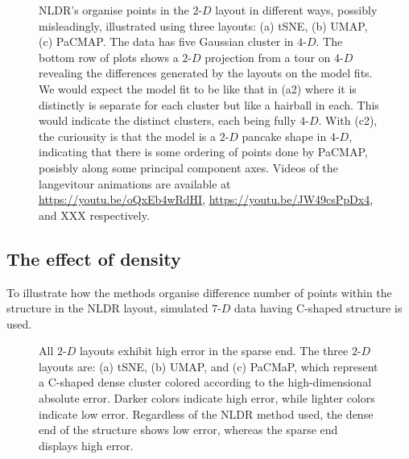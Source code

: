 \documentclass[
  12pt]{article}
\newcommand\gD{$2\text{-}D$}
\begin{document}
\begin{figure}[H]


\caption{\label{fig-five-gau-projs}NLDR's organise points in the \gD{}
layout in different ways, possibly misleadingly, illustrated using three
layouts: (a) tSNE, (b) UMAP, (c) PaCMAP. The data has five Gaussian
cluster in \(4\text{-}D\). The bottom row of plots shows a \gD{}
projection from a tour on \(4\text{-}D\) revealing the differences
generated by the layouts on the model fits. We would expect the model
fit to be like that in (a2) where it is distinctly is separate for each
cluster but like a hairball in each. This would indicate the distinct
clusters, each being fully \(4\text{-}D\). With (c2), the curiousity is
that the model is a \gD{} pancake shape in \(4\text{-}D\), indicating
that there is some ordering of points done by PaCMAP, posisbly along
some principal component axes. Videos of the langevitour animations are
available at \url{https://youtu.be/oQxEb4wRdHI},
\url{https://youtu.be/JW49csPpDx4}, and XXX respectively.}

\end{figure}%

\subsection{The effect of density}\label{the-effect-of-density}

To illustrate how the methods organise difference number of points
within the structure in the NLDR layout, simulated \(7\text{-}D\) data
having C-shaped structure is used.

\begin{figure}[H]


\caption{\label{fig-one-dens_clust-error}All \gD{} layouts exhibit high
error in the sparse end. The three \gD{} layouts are: (a) tSNE, (b)
UMAP, and (c) PaCMaP, which represent a C-shaped dense cluster colored
according to the high-dimensional absolute error. Darker colors indicate
high error, while lighter colors indicate low error. Regardless of the
NLDR method used, the dense end of the structure shows low error,
whereas the sparse end displays high error.}

\end{figure}%
\end{document}
